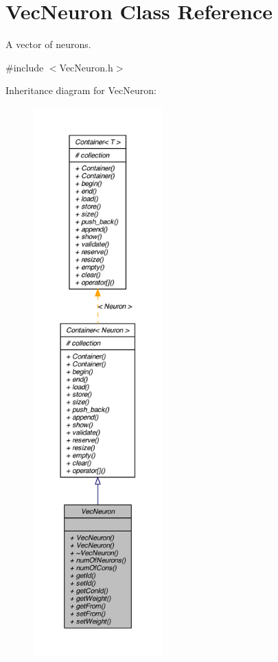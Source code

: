 \hypertarget{class_vec_neuron}{
\section{VecNeuron Class Reference}
\label{class_vec_neuron}
}


A vector of neurons.  




{\ttfamily \#include $<$VecNeuron.h$>$}



Inheritance diagram for VecNeuron:
\nopagebreak
\begin{figure}[H]
\begin{center}
\leavevmode
\includegraphics[height=600pt]{class_vec_neuron__inherit__graph}
\end{center}
\end{figure}


